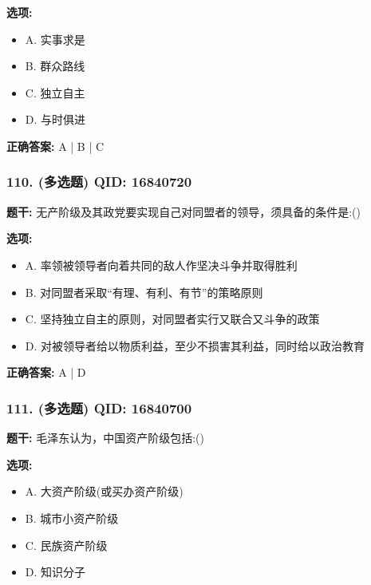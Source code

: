 \documentclass[12pt,UTF8]{ctexart}
\begin{document}
\textbf{选项:}
\begin{itemize}[leftmargin=*]

  \item A. 实事求是

  \item B. 群众路线

  \item C. 独立自主

  \item D. 与时俱进

\end{itemize}

\textbf{正确答案:}
A | B | C

\vspace{0.3em}\hrulefill\vspace{0.7em}

\subsubsection*{110. (多选题) \small QID: 16840720}

\textbf{题干:}
无产阶级及其政党要实现自己对同盟者的领导，须具备的条件是:()

\textbf{选项:}
\begin{itemize}[leftmargin=*]

  \item A. 率领被领导者向着共同的敌人作坚决斗争并取得胜利

  \item B. 对同盟者采取“有理、有利、有节”的策略原则

  \item C. 坚持独立自主的原则，对同盟者实行又联合又斗争的政策

  \item D. 对被领导者给以物质利益，至少不损害其利益，同时给以政治教育

\end{itemize}

\textbf{正确答案:}
A | D

\vspace{0.3em}\hrulefill\vspace{0.7em}

\subsubsection*{111. (多选题) \small QID: 16840700}

\textbf{题干:}
毛泽东认为，中国资产阶级包括:()

\textbf{选项:}
\begin{itemize}[leftmargin=*]

  \item A. 大资产阶级(或买办资产阶级)

  \item B. 城市小资产阶级

  \item C. 民族资产阶级

  \item D. 知识分子

\end{itemize}
\end{document}
